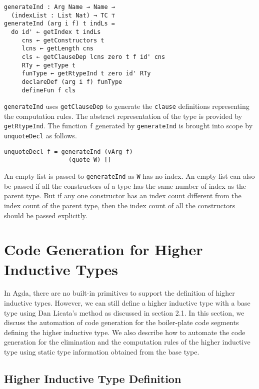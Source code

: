 \documentclass[sigplan,10pt]{acmart}
\begin{document}
\begin{center}
\begingroup
\begin{BVerbatim}
generateInd : Arg Name → Name → 
  (indexList : List Nat) → TC ⊤
generateInd (arg i f) t indLs =
  do id' ← getIndex t indLs
     cns ← getConstructors t
     lcns ← getLength cns
     cls ← getClauseDep lcns zero t f id' cns
     RTy ← getType t
     funType ← getRtypeInd t zero id' RTy
     declareDef (arg i f) funType
     defineFun f cls
\end{BVerbatim}
\endgroup
\end{center}

{\tt generateInd} uses {\tt getClauseDep} to generate the {\tt clause} definitions representing the computation rules. The abstract representation of the type is provided by {\tt getRtypeInd}. The function {\tt f} generated by {\tt generateInd} is brought into scope by {\tt unquoteDecl} as follows.
\begin{center}
\begingroup
\begin{BVerbatim}
unquoteDecl f = generateInd (vArg f) 
                  (quote W) []
\end{BVerbatim}
\endgroup
\end{center}

An empty list is passed to {\tt generateInd} as {\tt W} has no index. An empty list can also be passed if all the constructors of a type has the same number of index as the parent type. But if any one constructor has an index count different from the index count of the parent type, then the index count of all the constructors should be passed explicitly.

\section{Code Generation for Higher Inductive Types}
\label{sec:sec4}

In Agda, there are no built-in primitives to support the definition of higher inductive types. However, we can still define a higher inductive type with a base type using Dan Licata's \citep{Licata-2011} method as discussed in section 2.1. In this section, we discuss the automation of code generation for the boiler-plate code segments defining the higher inductive type. We also describe how to automate the code generation for the elimination and the computation rules of the higher inductive type using static type information obtained from the base type.


\subsection{Higher Inductive Type Definition}
\label{sec:sec4.1}
\end{document}
